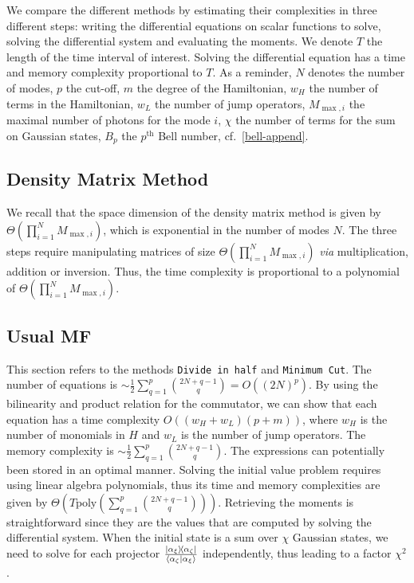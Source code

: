 We compare the different methods by estimating their complexities in three different steps: writing the differential equations on scalar functions to solve, solving the differential system and evaluating the moments. We denote $T$ the length of the time interval of interest. Solving the differential equation has a time and memory complexity proportional to $T$. As a reminder, $N$ denotes the number of modes, $p$ the cut-off, $m$ the degree of the Hamiltonian, $w_H$ the number of terms in the Hamiltonian, $w_L$ the number of jump operators,  $M_{\max, i}$ the maximal number of photons for the mode $i$, $\chi$ the number of terms for the sum on Gaussian states, $B_p$ the $p^{\text{th}}$ Bell number, cf.\@~\autoref{bell-append}.

\subsection{Density Matrix Method}
We recall that the space dimension of the density matrix method is given by $\Theta\left(\prod_{i = 1}^N M_{\max, i}\right)$, which is exponential in the number of modes $N$. The three steps require manipulating matrices of size $\Theta\left(\prod_{i = 1}^N M_{\max, i}\right)$ \textit{via} multiplication, addition or inversion. Thus, the time complexity is proportional to a polynomial of $\Theta\left(\prod_{i = 1}^N M_{\max, i}\right)$.

\subsection{Usual MF}
This section refers to the methods \texttt{Divide in half} and \texttt{Minimum Cut}. The number of equations is $\sim \frac{1}{2} \sum_{q=1}^p \binom{2N+q-1}{q} = O((2N)^p)$. By using the bilinearity and product relation for the commutator, we can show that each equation has a time complexity $O((w_H + w_L) (p+m))$, where $w_H$ is the number of monomials in $H$ and $w_L$ is the number of jump operators. The memory complexity is $\sim \frac{1}{2} \sum_{q=1}^p \binom{2N+q-1}{q}$. The expressions can potentially been stored in an optimal manner. Solving the initial value problem requires using linear algebra polynomials, thus its time and memory complexities are given by $\Theta\left(T \text{poly}\left(\sum_{q=1}^p \binom{2N+q-1}{q}\right)\right)$. Retrieving the moments is straightforward since they are the values that are computed by solving the differential system. When the initial state is a sum over $\chi$ Gaussian states, we need to solve for each projector $\frac{\ketbra{\alpha_\xi}{\alpha_\zeta}}{\braket{\alpha_\zeta}{\alpha_\xi}}$ independently, thus leading to a factor $\chi^2$.

